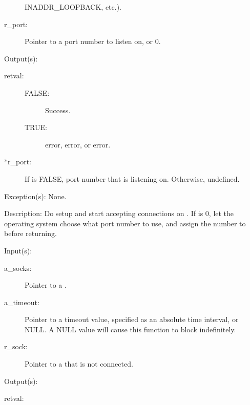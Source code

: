 \begin{capi}
\begin{capilist}
\begin{description}
			INADDR\_LOOPBACK, etc.).
		\item[r\_port: ]
			Pointer to a port number to listen on, or 0.
		\end{description}
	\item[Output(s): ]
		\begin{description}\item[]
		\item[retval: ]
			\begin{description}\item[]
			\item[FALSE: ]
				Success.
			\item[TRUE: ]
				 error,  error, or
				 error.
			\end{description}
		\item[*r\_port: ]
			If  is FALSE, port number that
			 is listening on.  Otherwise, undefined.
		\end{description}
	\item[Exception(s): ] None.
	\item[Description: ]
		Do setup and start accepting connections on .  If
		 is 0, let the operating system choose what port
		number to use, and assign the number to  before
		returning.
	\end{capilist}
\label{socks_accept}
	\begin{capilist}
	\item[Input(s): ]
		\begin{description}\item[]
		\item[a\_socks: ]
			Pointer to a .
		\item[a\_timeout: ]
			Pointer to a timeout value, specified as an absolute
			time interval, or NULL.  A NULL value will cause this
			function to block indefinitely.
		\item[r\_sock: ]
			Pointer to a  that is not connected.
		\end{description}
	\item[Output(s): ]
		\begin{description}\item[]
		\item[retval: ]
			\begin{description}\item[]

\end{description}
\end{description}
\end{capilist}
\end{capi}
